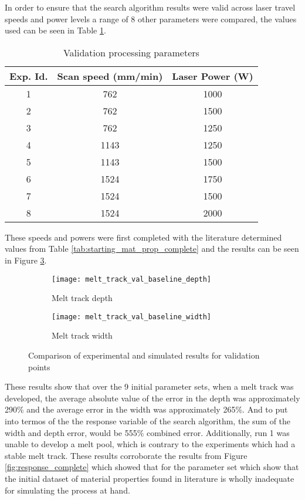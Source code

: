 \label{validation}

In order to ensure that the search algorithm results were valid across laser travel speeds and power levels a range of 8 other parameters were compared, the values used can be seen in Table \ref{tab:val_parameters}.
\begin{table}[!htb]
	\centering
	\caption{Validation processing parameters}
	\label{tab:val_parameters}
		\begin{tabular}{|c|c|c|} \hline 
			Exp. Id. & Scan speed (mm/min) & Laser Power (W) \\ \hline
			1 & 762 & 1000 \\ \hline  %
			2 & 762 & 1500 \\ \hline  %
			3 & 762 & 1250 \\ \hline  %
			4 & 1143 & 1250 \\ \hline %
			5 & 1143 & 1500 \\ \hline  %
			6 & 1524 & 1750 \\ \hline  %
			7 & 1524 & 1500 \\ \hline  %
			8 & 1524 & 2000 \\ \hline  %
		\end{tabular}
\end{table}

These speeds and powers were first completed with the literature determined values from Table \ref{tab:starting_mat_prop_complete} and the results can be seen in Figure \ref{fig:melt_track_val_baseline}.
\begin{figure}[!htb]\centering
	\begin{subfigure}[c]{0.45\textwidth}\centering
	\texttt{[image: melt\_track\_val\_baseline\_depth]}
	\caption{Melt track depth}
	\label{fig:melt_track_val_baseline_depth}
	\end{subfigure}\hfill{}
		\begin{subfigure}[c]{0.45\textwidth}\centering
		\texttt{[image: melt\_track\_val\_baseline\_width]}
		\caption{Melt track width}
		\label{fig:melt_track_val_baseline_width}
		\end{subfigure}
	\caption{Comparison of experimental and simulated results for validation points}
	\label{fig:melt_track_val_baseline}
\end{figure}
These results show that over the 9 initial parameter sets, when a melt track was developed, the average absolute value of the error in the depth was approximately 290\% and the average error in the width was approximately 265\%.  And to put into termos of the the response variable of the search algorithm, the sum of the width and depth error, would be 555\% combined error.
Additionally, run 1 was unable to develop a melt pool, which is contrary to the experiments which had a stable melt track.  These results corroborate the results from Figure \ref{fig:response_complete} which showed that for the parameter set which show that the initial dataset of material properties found in literature is wholly inadequate for simulating the process at hand. 

